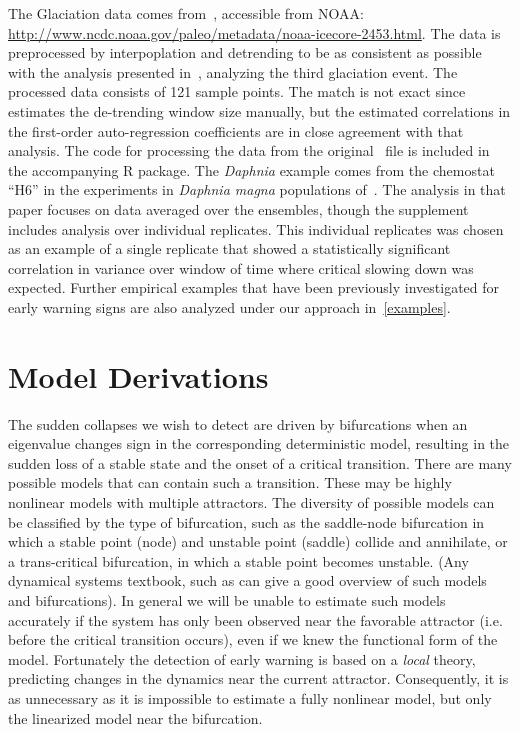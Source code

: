 \documentclass[authoryear, preprint,review,12pt]{elsarticle}
\begin{document}
The Glaciation data comes from~\citet{Petit1999}, accessible from NOAA:
\href{http://www.ncdc.noaa.gov/paleo/metadata/noaa-icecore-2453.html}{http://www.ncdc.noaa.gov/paleo/metadata/noaa-icecore-2453.html}.
The data is preprocessed by interpoplation and detrending to be as consistent as possible with the analysis presented in~\citet{Dakos2008},
analyzing the third glaciation event. 
The processed data consists of 121 sample points. 
The match is not exact since~\citet{Dakos2008} estimates the de-trending window size manually,
but the estimated correlations in the first-order auto-regression coefficients are in close agreement with that analysis. 
The code for processing the data from the original~\citet{Petit1999} file is included in the accompanying R package.
The \emph{Daphnia} example comes from the chemostat ``H6'' in the experiments in \emph{Daphnia magna} populations of~\citet{Drake2010}. 
The analysis in that paper focuses on data averaged over the ensembles, though the supplement includes analysis over individual replicates. 
This individual replicates was chosen as an example of a single replicate 
that showed a statistically significant correlation in variance over window of time where critical slowing down was expected. 
Further empirical examples that have been previously investigated for early warning signs are also analyzed under our approach in~\ref{examples}.   



\section{Model Derivations}\label{modelderivations}
The sudden collapses we wish to detect are driven by bifurcations when an eigenvalue changes sign in the corresponding deterministic model,
resulting in the sudden loss of a stable state and the onset of a critical transition.
There are many possible models that can contain such a transition.
These may be highly nonlinear models with multiple attractors.
The diversity of possible models can be classified by the type of bifurcation,
such as the saddle-node bifurcation in which a stable point (node) and unstable point (saddle) collide and annihilate,
or a trans-critical bifurcation, in which a stable point becomes unstable.  
(Any dynamical systems textbook, such as \citet{Guckenheimer1983} can give a good overview of such models and bifurcations). 
In general we will be unable to estimate such models accurately if the system has only been observed near the favorable attractor
(i.e. before the critical transition occurs),
even if we knew the functional form of the model.
Fortunately the detection of early warning is based on a \emph{local} theory,
predicting changes in the dynamics near the current attractor.
Consequently, it is as unnecessary as it is impossible to estimate a fully nonlinear model,
but only the linearized model near the bifurcation.
\end{document}
